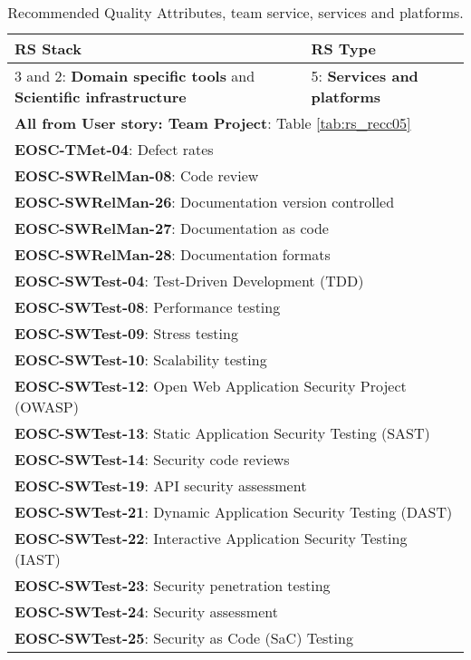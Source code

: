 \begin{center}
\begin{table}[h]

  \small
  \begin{tabular}{|p{0.65\linewidth}|p{0.35\linewidth}|} \hline

    \textbf{RS Stack} & \textbf{RS Type} \\ \hline  \hline
    3 and 2: \textbf{Domain specific tools} and \textbf{Scientific infrastructure} &
    5: \textbf{Services and platforms} \\ \hline \hline
    \multicolumn{2}{|l|}{\textbf{All from User story: Team Project}: Table \ref{tab:rs_recc05}} \\ \hline
    \multicolumn{2}{|l|}{\textbf{EOSC-TMet-04}: Defect rates} \\ \hline
    \multicolumn{2}{|l|}{\textbf{EOSC-SWRelMan-08}: Code review} \\ \hline
    \multicolumn{2}{|l|}{\textbf{EOSC-SWRelMan-26}: Documentation version controlled} \\ \hline
    \multicolumn{2}{|l|}{\textbf{EOSC-SWRelMan-27}: Documentation as code} \\ \hline
    \multicolumn{2}{|l|}{\textbf{EOSC-SWRelMan-28}: Documentation formats} \\ \hline
    \multicolumn{2}{|l|}{\textbf{EOSC-SWTest-04}: Test-Driven Development (TDD)} \\ \hline
    \multicolumn{2}{|l|}{\textbf{EOSC-SWTest-08}: Performance testing} \\ \hline
    \multicolumn{2}{|l|}{\textbf{EOSC-SWTest-09}: Stress testing} \\ \hline
    \multicolumn{2}{|l|}{\textbf{EOSC-SWTest-10}: Scalability testing} \\ \hline
    \multicolumn{2}{|l|}{\textbf{EOSC-SWTest-12}: Open Web Application Security Project (OWASP)} \\ \hline
    \multicolumn{2}{|l|}{\textbf{EOSC-SWTest-13}: Static Application Security Testing (SAST)} \\ \hline
    \multicolumn{2}{|l|}{\textbf{EOSC-SWTest-14}: Security code reviews} \\ \hline
    \multicolumn{2}{|l|}{\textbf{EOSC-SWTest-19}: API security assessment} \\ \hline
    \multicolumn{2}{|l|}{\textbf{EOSC-SWTest-21}: Dynamic Application Security Testing (DAST)} \\ \hline
    \multicolumn{2}{|l|}{\textbf{EOSC-SWTest-22}: Interactive Application Security Testing (IAST)} \\ \hline
    \multicolumn{2}{|l|}{\textbf{EOSC-SWTest-23}: Security penetration testing} \\ \hline
    \multicolumn{2}{|l|}{\textbf{EOSC-SWTest-24}: Security assessment} \\ \hline
    \multicolumn{2}{|l|}{\textbf{EOSC-SWTest-25}: Security as Code (SaC) Testing} \\ \hline

  \end{tabular}
  \caption{Recommended Quality Attributes, team service, services and platforms.}
  \label{tab:rs_recc08}
\end{table}
\end{center}

